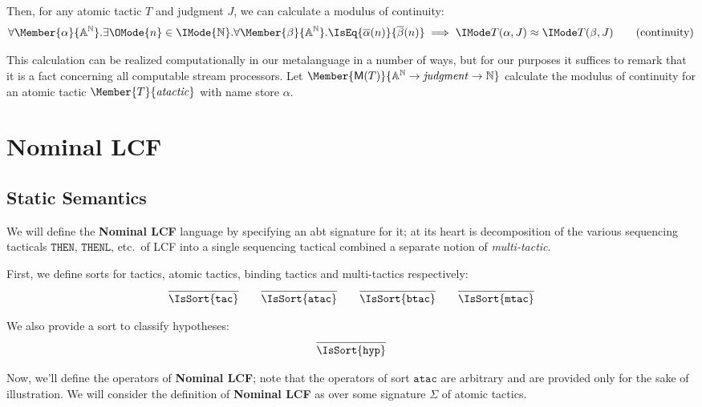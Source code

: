 Then, for any atomic tactic $T$ and judgment $J$, we can calculate a
modulus of continuity:
\begin{equation}
  \forall \Member{\alpha}{\MLStream{\MLAtom}}.
  \exists \OMode{n}\in\IMode{\MLNat}.
  \forall \Member{\beta}{\MLStream{\MLAtom}}.
    \IsEq{\bar{\alpha}(n)}{\bar{\beta}(n)}\implies \KleeneEq{T(\alpha,J)}{T(\beta,J)}
  \tag{continuity}
\end{equation}

This calculation can be realized computationally in our metalanguage in a
number of ways, but for our purposes it suffices to remark that it is a fact
concerning all computable stream processors. Let
$\Member{\ModC{T}}{\MLStream{\MLAtom}\to\LCFJudgment\to\MLNat}$ calculate the modulus of continuity
for an atomic tactic $\Member{T}{\LCFAtomicTactic}$ with name store $\alpha$.

\section{Nominal LCF}

\subsection{Static Semantics}

\newcommand\SortATac{\mathtt{atac}}
\newcommand\SortBTac{\mathtt{btac}}
\newcommand\SortTac{\mathtt{tac}}
\newcommand\SortMTac{\mathtt{mtac}}
\newcommand\SortHyp{\mathtt{hyp}}

We will define the \textbf{Nominal LCF} language by specifying an abt signature
for it; at its heart is decomposition of the various sequencing tacticals
$\mathtt{THEN}$, $\mathtt{THENL}$, etc.\ of LCF into a single sequencing
tactical combined a separate notion of \emph{multi-tactic}.

First, we define sorts for tactics, atomic tactics, binding tactics and multi-tactics
respectively:
\begin{gather*}
  \infer{
    \IsSort{\SortTac}
  }{}
  \qquad
  \infer{
    \IsSort{\SortATac}
  }{}
  \qquad
  \infer{
    \IsSort{\SortBTac}
  }{}
  \qquad
  \infer{
    \IsSort{\SortMTac}
  }{}
\end{gather*}

We also provide a sort to classify hypotheses:
\[
  \infer{
    \IsSort{\SortHyp}
  }{
  }
\]

Now, we'll define the operators of \textbf{Nominal LCF}; note that the
operators of sort $\SortATac$ are arbitrary and are provided only for the sake
of illustration. We will consider the definition of \textbf{Nominal LCF} as
over some signature $\Sigma$ of atomic tactics.


